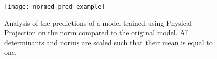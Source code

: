 \begin{figure}[H]
	\centering
	\texttt{[image: normed\_pred\_example]}
	\caption{Analysis of the predictions of a model trained using Physical Projection on the norm compared to the original model. All determinants and norms are scaled such that their mean is equal to one.}
	\label{fig:normed_pred_example}
\end{figure}


\clearpage
